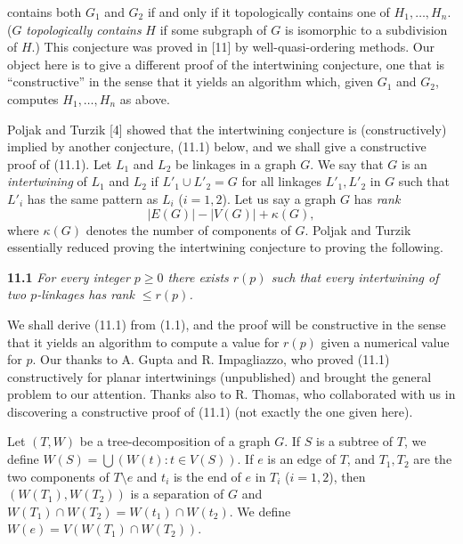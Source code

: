 \noindent contains both $G_1$ and $G_2$ if and only if it topologically contains one of $H_1, \dots, H_n$. ($G$ \textit{topologically contains} $H$ if some subgraph of $G$ is isomorphic to a subdivision of $H$.) This conjecture was proved in [11] by well-quasi-ordering methods. Our object here is to give a different proof of the intertwining conjecture, one that is ``constructive'' in the sense that it yields an algorithm which, given $G_1$ and $G_2$, computes $H_1, \dots, H_n$ as above.

Poljak and Turzik [4] showed that the intertwining conjecture is (constructively) implied by another conjecture, (11.1) below, and we shall give a constructive proof of (11.1). Let $L_1$ and $L_2$ be linkages in a graph $G$. We say that $G$ is an \textit{intertwining} of $L_1$ and $L_2$ if $L'_1 \cup L'_2 = G$ for all linkages $L'_1, L'_2$ in $G$ such that $L'_i$ has the same pattern as $L_i$ ($i = 1, 2$). Let us say a graph $G$ has \textit{rank}
\begin{equation*}
|E(G)| - |V(G)| + \kappa(G),
\end{equation*}
where $\kappa(G)$ denotes the number of components of $G$. Poljak and Turzik essentially reduced proving the intertwining conjecture to proving the following.

\textbf{11.1} \textit{For every integer $p \ge 0$ there exists $r(p)$ such that every intertwining of two $p$-linkages has rank $\le r(p)$.}

We shall derive (11.1) from (1.1), and the proof will be constructive in the sense that it yields an algorithm to compute a value for $r(p)$ given a numerical value for $p$. Our thanks to A. Gupta and R. Impagliazzo, who proved (11.1) constructively for planar intertwinings (unpublished) and brought the general problem to our attention. Thanks also to R. Thomas, who collaborated with us in discovering a constructive proof of (11.1) (not exactly the one given here).

Let $(T, W)$ be a tree-decomposition of a graph $G$. If $S$ is a subtree of $T$, we define $W(S) = \bigcup (W(t) : t \in V(S))$. If $e$ is an edge of $T$, and $T_1, T_2$ are the two components of $T \setminus e$ and $t_i$ is the end of $e$ in $T_i$ ($i = 1, 2$), then $(W(T_1), W(T_2))$ is a separation of $G$ and $W(T_1) \cap W(T_2) = W(t_1) \cap W(t_2)$. We define $W(e) = V(W(T_1) \cap W(T_2))$.

